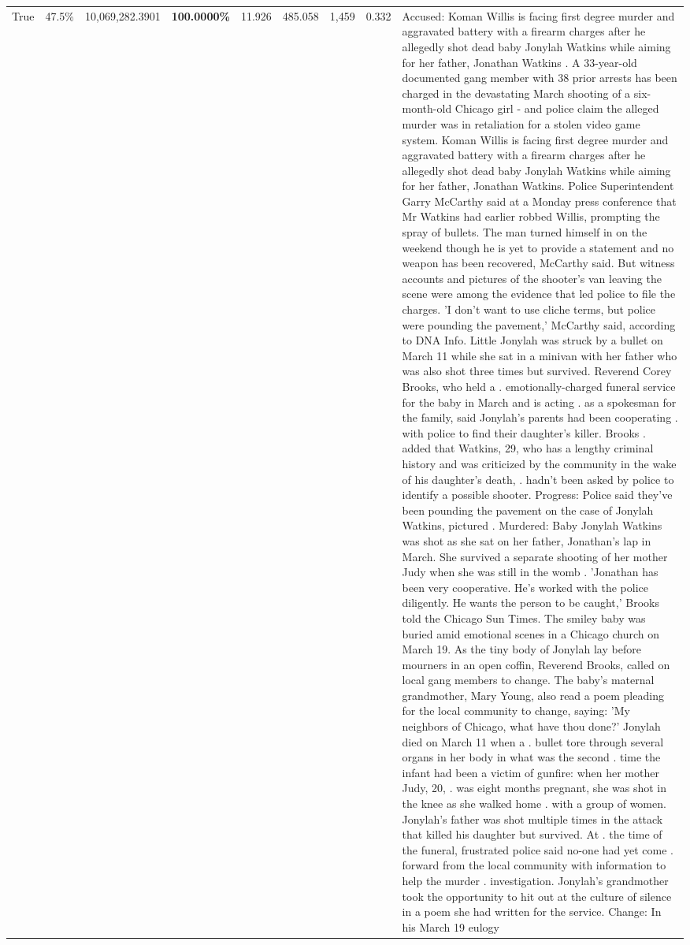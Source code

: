 \begin{table}[H]
\begin{tabular}{lllrlllll}
True & 47.5\% & 10,069,282.3901 & \bfseries \color{red} 100.0000\% & 11.926 & 485.058 & 1,459 & 0.332 & Accused: Koman Willis is facing first degree murder and aggravated battery with a firearm charges after he allegedly shot dead baby Jonylah Watkins while aiming for her father, Jonathan Watkins . A 33-year-old documented gang member with 38 prior arrests has been charged in the devastating March shooting of a six-month-old Chicago girl - and police claim the alleged murder was in retaliation for a stolen video game system. Koman Willis is facing first degree murder and aggravated battery with a firearm charges after he allegedly shot dead baby Jonylah Watkins while aiming for her father, Jonathan Watkins. Police Superintendent Garry McCarthy said at a Monday press conference that Mr Watkins had earlier robbed Willis, prompting the spray of bullets. The man turned himself in on the weekend though he is yet to provide a statement and no weapon has been recovered, McCarthy said. But witness accounts and pictures of the shooter's van leaving the scene were among the evidence that led police to file the charges. 'I don't want to use cliche terms, but police were pounding the pavement,' McCarthy said, according to DNA Info. Little Jonylah was struck by a bullet on March 11 while she sat in a minivan with her father who was also shot three times but survived. Reverend Corey Brooks, who held a . emotionally-charged funeral service for the baby in March and is acting . as a spokesman for the family, said Jonylah's parents had been cooperating . with police to find their daughter's killer. Brooks . added that Watkins, 29, who has a lengthy criminal history and was criticized by the community in the wake of his daughter's death, . hadn't been asked by police to identify a possible shooter. Progress: Police said they've been pounding the pavement on the case of Jonylah Watkins, pictured . Murdered: Baby Jonylah Watkins was shot as she sat on her father, Jonathan's lap in March. She survived a separate shooting of her mother Judy when she was still in the womb . 'Jonathan has been very cooperative. He's worked with the police diligently. He wants the person to be caught,' Brooks told the Chicago Sun Times. The smiley baby was buried amid emotional scenes in a Chicago church on March 19. As the tiny body of Jonylah lay before mourners in an open coffin, Reverend Brooks, called on local gang members to change. The baby's maternal grandmother, Mary Young, also read a poem pleading for the local community to change, saying: 'My neighbors of Chicago, what have thou done?' Jonylah died on March 11 when a . bullet tore through several organs in her body in what was the second . time the infant had been a victim of gunfire: when her mother Judy, 20, . was eight months pregnant, she was shot in the knee as she walked home . with a group of women. Jonylah's father was shot multiple times in the attack that killed his daughter but survived. At . the time of the funeral, frustrated police said no-one had yet come . forward from the local community with information to help the murder . investigation. Jonylah's grandmother took the opportunity to hit out at the culture of silence in a poem she had written for the service. Change: In his March 19 eulogy 
\end{tabular}
\end{table}
